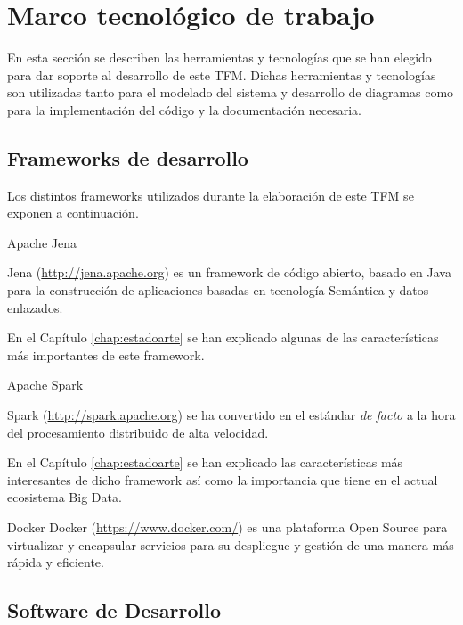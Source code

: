 

\section{Marco tecnológico de trabajo}

\label{sec:marcotrabajo}

En esta sección se describen las herramientas y tecnologías que se han elegido
para dar soporte al desarrollo de este \acs{TFM}. Dichas herramientas y tecnologías
son utilizadas tanto para el modelado del sistema y desarrollo de diagramas como
para la implementación del código y la documentación necesaria. 

\subsection{Frameworks de desarrollo}

Los distintos frameworks utilizados durante la elaboración de este \acs{TFM} se
exponen a continuación. 

\begin{definitionlist} 

\item[Apache Jena]

Jena (\url{http://jena.apache.org}) es un framework de código abierto, basado en
Java para la construcción de aplicaciones basadas en tecnología Semántica y
datos enlazados. 

En el Capítulo \ref{chap:estadoarte} se han explicado algunas de las
características más importantes de este framework. 

\item[Apache Spark]

  Spark (\url{http://spark.apache.org}) se ha convertido en el estándar
  \textit{de facto} a la hora del procesamiento distribuido de alta velocidad.

  En el Capítulo \ref{chap:estadoarte} se han explicado las características más
  interesantes de dicho framework así como la importancia que tiene en el actual
  ecosistema Big Data.

\item[Docker]
  Docker (\url{https://www.docker.com/}) es una plataforma Open Source para
  virtualizar y encapsular servicios para su despliegue y gestión de una manera
  más rápida y eficiente.

\end{definitionlist}

\subsection{Software de Desarrollo}

